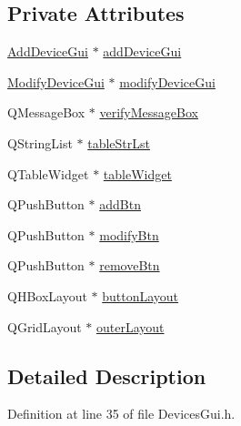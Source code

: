 \subsection*{Private Attributes}
\begin{DoxyCompactItemize}
\item 
\hyperlink{class_add_device_gui}{Add\-Device\-Gui} $\ast$ \hyperlink{class_devices_gui_aeebea560adf26f2fbd85bfe0a7a3d4bb}{add\-Device\-Gui}
\item 
\hyperlink{class_modify_device_gui}{Modify\-Device\-Gui} $\ast$ \hyperlink{class_devices_gui_a7f6a808cd74775c594f0fe6e313d8eaa}{modify\-Device\-Gui}
\item 
Q\-Message\-Box $\ast$ \hyperlink{class_devices_gui_aae408c61187cf1ace6291cc2f726546b}{verify\-Message\-Box}
\item 
Q\-String\-List $\ast$ \hyperlink{class_devices_gui_a9207754164d2932897101377acd8a89b}{table\-Str\-Lst}
\item 
Q\-Table\-Widget $\ast$ \hyperlink{class_devices_gui_a8215658b3b6f9fc25ec3c1d85ca01b8f}{table\-Widget}
\item 
Q\-Push\-Button $\ast$ \hyperlink{class_devices_gui_aecc849e7e57daae88016fd861817a41e}{add\-Btn}
\item 
Q\-Push\-Button $\ast$ \hyperlink{class_devices_gui_a60afa6184b9acba46a0c61660cf17018}{modify\-Btn}
\item 
Q\-Push\-Button $\ast$ \hyperlink{class_devices_gui_a43e4c21a58125035b095b4b64be349a0}{remove\-Btn}
\item 
Q\-H\-Box\-Layout $\ast$ \hyperlink{class_devices_gui_a36b9c0d9fbce9b50b1def57dd6185e23}{button\-Layout}
\item 
Q\-Grid\-Layout $\ast$ \hyperlink{class_devices_gui_aef89fe012f81c1c16826e228fb0d5af4}{outer\-Layout}
\end{DoxyCompactItemize}


\subsection{Detailed Description}


Definition at line 35 of file Devices\-Gui.\-h.



